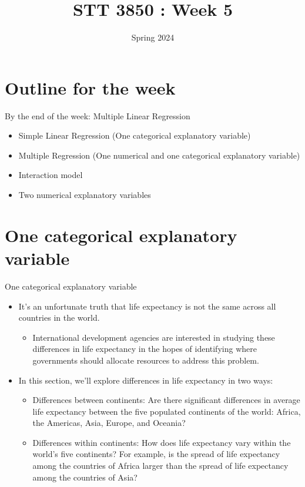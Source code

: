 \documentclass[
  ignorenonframetext,
]{beamer}
\title{STT 3850 : Week 5}
\author{Spring 2024}
\date{}
\institute{Appalachian State University}
\providecommand{\tightlist}{%
  \setlength{\itemsep}{0pt}\setlength{\parskip}{0pt}}
\begin{document}
\frame{\titlepage}

\hypertarget{outline-for-the-week}{%
\section{Outline for the week}\label{outline-for-the-week}}

\begin{frame}{By the end of the week: Multiple Linear Regression}
\protect\hypertarget{by-the-end-of-the-week-multiple-linear-regression}{}
\begin{itemize}
\tightlist
\item
  Simple Linear Regression (One categorical explanatory variable)
\item
  Multiple Regression (One numerical and one categorical explanatory
  variable)
\item
  Interaction model
\item
  Two numerical explanatory variables
\end{itemize}
\end{frame}

\hypertarget{one-categorical-explanatory-variable}{%
\section{One categorical explanatory
variable}\label{one-categorical-explanatory-variable}}

\begin{frame}{One categorical explanatory variable}
\protect\hypertarget{one-categorical-explanatory-variable-1}{}
\begin{itemize}
\item
  It's an unfortunate truth that life expectancy is not the same across
  all countries in the world.

  \begin{itemize}
  \tightlist
  \item
    International development agencies are interested in studying these
    differences in life expectancy in the hopes of identifying where
    governments should allocate resources to address this problem.
  \end{itemize}
\item
  In this section, we'll explore differences in life expectancy in two
  ways:

  \begin{itemize}
  \tightlist
  \item
    Differences between continents: Are there significant differences in
    average life expectancy between the five populated continents of the
    world: Africa, the Americas, Asia, Europe, and Oceania?
  \item
    Differences within continents: How does life expectancy vary within
    the world's five continents? For example, is the spread of life
    expectancy among the countries of Africa larger than the spread of
    life expectancy among the countries of Asia?
  \end{itemize}
\end{itemize}
\end{frame}
\end{document}
